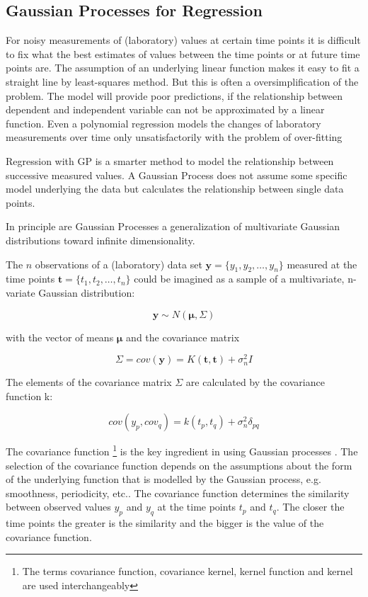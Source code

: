 \subsection{Gaussian Processes for Regression}
	For noisy measurements of (laboratory) values at certain time points it is difficult to fix
	what the best estimates of values between the time points or at future time points are.
	The assumption of an underlying linear function makes it easy to fit a straight line by least-squares method. But this is often a oversimplification of the problem. The model will provide poor predictions, if the relationship between  dependent and independent variable can not be approximated by a linear function.
	Even a polynomial regression models the changes of laboratory measurements  over time only unsatisfactorily with the problem of over-fitting
	
	Regression with \ac{GP} is a smarter method to model the relationship between successive measured values. 
	A Gaussian Process does not assume some specific model underlying the data but calculates the relationship between single data points.
	
	In principle are Gaussian Processes a generalization of multivariate Gaussian distributions toward infinite dimensionality.
	
	The $n$ observations of a (laboratory) data set $\pmb{y}=\{y_{1},y_{2}, \ldots ,y_{n}\}$ measured at the time points $\pmb{t}=\{t_{1},t_{2}, \ldots ,t_{n}\}$ could be imagined as a sample of a multivariate, n-variate Gaussian distribution:
	
	\begin{displaymath}
		\pmb{y} \sim N(\pmb{\mu},\Sigma)
	\end{displaymath}
	
	with the vector of means $\pmb{\mu}$ and the covariance matrix
	
	
	\begin{displaymath}
		\Sigma = cov(\pmb{y}) = K(\pmb{t},\pmb{t}) + \sigma^{2}_{n}I
	\end{displaymath}
	
	The elements of the covariance matrix $\Sigma$ are calculated by the covariance function k:
	
	\begin{displaymath}
		cov(y_{p},cov_{q}) = k(t_{p},t_{q}) + \sigma^{2}_{n} \delta_{pq}
	\end{displaymath}
	
	The covariance function \footnote{The terms covariance function, covariance kernel, kernel function and kernel are used interchangeably} is the key ingredient in using Gaussian processes \cite{Wilson_2013}. The selection of the covariance function depends on the assumptions about the form of the underlying  function that is modelled by the Gaussian process, e.g. smoothness, periodicity, etc.. The covariance function determines the similarity between observed values $y_{p}$ and $y_{q}$ at the time points $t_{p}$ and $t_{q}$. The closer the time points the greater is the similarity and the bigger is the value of the covariance function.  
	
